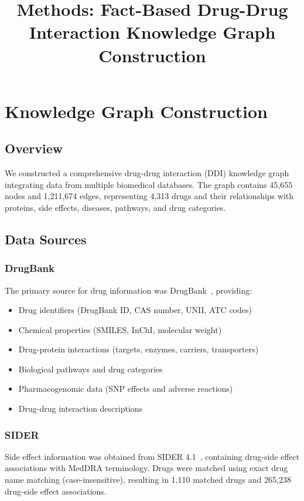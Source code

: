 \documentclass[11pt]{article}
\title{Methods: Fact-Based Drug-Drug Interaction Knowledge Graph Construction}
\author{}
\date{}
\begin{document}
\maketitle

\section{Knowledge Graph Construction}

\subsection{Overview}

We constructed a comprehensive drug-drug interaction (DDI) knowledge graph integrating data from multiple biomedical databases. The graph contains 45,655 nodes and 1,211,674 edges, representing 4,313 drugs and their relationships with proteins, side effects, diseases, pathways, and drug categories.

\subsection{Data Sources}

\subsubsection{DrugBank}
The primary source for drug information was DrugBank~\cite{wishart2018drugbank}, providing:
\begin{itemize}
    \item Drug identifiers (DrugBank ID, CAS number, UNII, ATC codes)
    \item Chemical properties (SMILES, InChI, molecular weight)
    \item Drug-protein interactions (targets, enzymes, carriers, transporters)
    \item Biological pathways and drug categories
    \item Pharmacogenomic data (SNP effects and adverse reactions)
    \item Drug-drug interaction descriptions
\end{itemize}

\subsubsection{SIDER}
Side effect information was obtained from SIDER 4.1~\cite{kuhn2016sider}, containing drug-side effect associations with MedDRA terminology. Drugs were matched using exact drug name matching (case-insensitive), resulting in 1,110 matched drugs and 265,238 drug-side effect associations.
\end{document}
